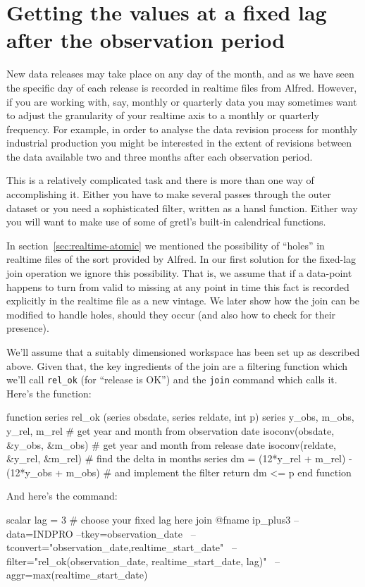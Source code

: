 \section{Getting the values at a fixed lag after the observation
  period}
\label{sec:realtime-fixed-lag}

New data releases may take place on any day of the month, and as we
have seen the specific day of each release is recorded in realtime
files from Alfred. However, if you are working with, say, monthly or
quarterly data you may sometimes want to adjust the granularity of
your realtime axis to a monthly or quarterly frequency. For example,
in order to analyse the data revision process for monthly industrial
production you might be interested in the extent of revisions between
the data available two and three months after each observation period.

This is a relatively complicated task and there is more than one way
of accomplishing it. Either you have to make several passes through
the outer dataset or you need a sophisticated filter, written as a
hansl function. Either way you will want to make use of some of
gretl's built-in calendrical functions.

In section~\ref{sec:realtime-atomic} we mentioned the possibility of
``holes'' in realtime files of the sort provided by Alfred. In our
first solution for the fixed-lag join operation we ignore this
possibility. That is, we assume that if a data-point happens to turn
from valid to missing at any point in time this fact is recorded
explicitly in the realtime file as a new vintage. We later show how
the join can be modified to handle holes, should they occur (and also
how to check for their presence).

We'll assume that a suitably dimensioned workspace has been set up as
described above. Given that, the key ingredients of the join are a
filtering function which we'll call \verb|rel_ok| (for ``release is
OK'') and the \texttt{join} command which calls it. Here's the
function:
%
\begin{code}
function series rel_ok (series obsdate, series reldate, int p)
  series y_obs, m_obs, y_rel, m_rel
  # get year and month from observation date
  isoconv(obsdate, &y_obs, &m_obs)
  # get year and month from release date
  isoconv(reldate, &y_rel, &m_rel)
  # find the delta in months
  series dm = (12*y_rel + m_rel) - (12*y_obs + m_obs)
  # and implement the filter
  return dm <= p
end function
\end{code}
%
And here's the command:
%
\begin{code}
scalar lag = 3  # choose your fixed lag here
join @fname ip_plus3 --data=INDPRO --tkey=observation_date \
--tconvert="observation_date,realtime_start_date" \
--filter="rel_ok(observation_date, realtime_start_date, lag)" \
--aggr=max(realtime_start_date)
\end{code}

